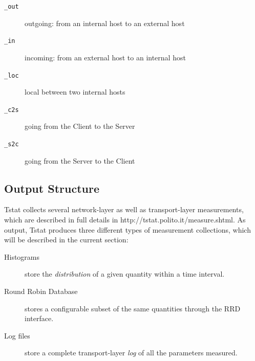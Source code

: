 \documentclass[11pt]{article}
\begin{document}
\begin{description}

\item[{\texttt{\_out}}] \mbox{}

outgoing: from an internal host to an external host


\item[{\texttt{\_in}}] \mbox{}

incoming: from an external host to an internal host


\item[{\texttt{\_loc}}] \mbox{}

local between two internal hosts


\item[{\texttt{\_c2s}}] \mbox{}

going from the Client to the Server


\item[{\texttt{\_s2c}}] \mbox{}

going from the Server to the Client

\end{description}
\subsection{Output Structure\label{Output_Structure}}


Tstat collects several network-layer as well as transport-layer measurements,
which are described in full details in \textsf{http://tstat.polito.it/measure.shtml}.
As output, Tstat produces three different types of measurement collections, which
will be described in the current section:

\begin{description}

\item[{Histograms}] \mbox{}

store the \textit{distribution} of a given quantity within a time interval.


\item[{Round Robin Database}] \mbox{}

stores a configurable subset of the same quantities through the RRD interface.


\item[{Log files}] \mbox{}

store a complete transport-layer \textit{log} of all the parameters measured.

\end{description}
\end{document}
